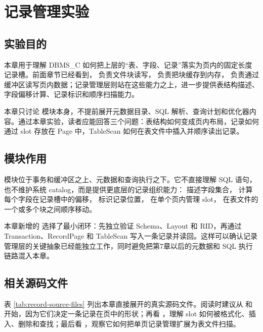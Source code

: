 \chapter{记录管理实验}
\label{chap:record}

\section{实验目的}
\label{sec:record-purpose}

本章用于理解 DBMS\_C 如何把上层的“表、字段、记录”落实为页内的固定长度记录槽。前面章节已经看到， 负责文件块读写， 负责把块缓存到内存， 负责通过缓冲区读写页内数据；记录管理层则站在这些能力之上，进一步提供表结构描述、字段偏移计算、记录标识和顺序扫描能力。

本章只讨论  模块本身，不提前展开元数据目录、SQL 解析、查询计划和优化器内容。通过本章实验，读者应能回答三个问题：表结构如何变成页内布局，记录如何通过 slot 存放在 Page 中，TableScan 如何在表文件中插入并顺序读出记录。

\section{模块作用}
\label{sec:record-role}

 模块位于事务和缓冲区之上、元数据和查询执行之下。它不直接理解 SQL 语句，也不维护系统 catalog，而是提供更底层的记录组织能力： 描述字段集合， 计算每个字段在记录槽中的偏移， 标识记录位置， 在单个页内管理 slot， 在表文件的一个或多个块之间顺序移动。

本章新增的  选择了最小闭环：先独立验证 Schema、Layout 和 RID，再通过 Transaction、RecordPage 和 TableScan 写入一条记录并读回。这样可以确认记录管理层的关键抽象已经能独立工作，同时避免把第7章以后的元数据和 SQL 执行链路混入本章。

\section{相关源码文件}
\label{sec:record-source-files}

表 \ref{tab:record-source-files} 列出本章直接展开的真实源码文件。阅读时建议从  和  开始，因为它们决定一条记录在页中的形状；再看 ，理解 slot 如何被格式化、插入、删除和查找；最后看 ，观察它如何把单页记录管理扩展为表文件扫描。

